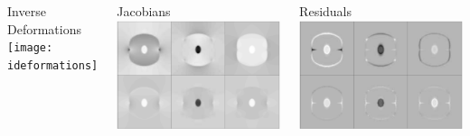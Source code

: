\documentclass{beamer}
\begin{document}
\begin{frame}
\begin{columns}[c]
Inverse Deformations\\
\texttt{[image: ideformations]}

Jacobians\\
\includegraphics[width=\textwidth]{jacobians}

Residuals\\
\includegraphics[width=\textwidth]{alpha}

\end{columns}
\end{frame}
\end{document}
